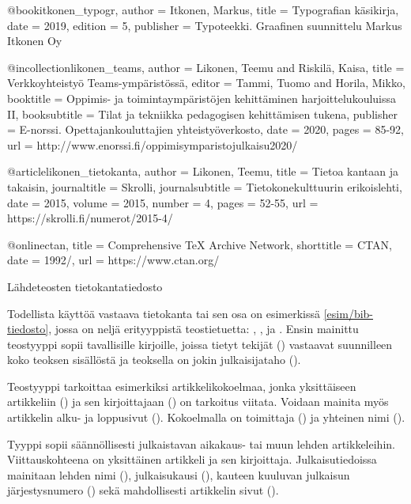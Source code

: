 \begin{esimerkki*}
\begin{koodilohko}
@book{itkonen_typogr,
  author = {Itkonen, Markus},
  title = {Typografian käsikirja},
  date = {2019},
  edition = {5},
  publisher = {Typoteekki. Graafinen suunnittelu Markus Itkonen Oy}
}

@incollection{likonen_teams,
  author = {Likonen, Teemu and Riskilä, Kaisa},
  title = {Verkkoyhteistyö Teams-ympäristössä},
  editor = {Tammi, Tuomo and Horila, Mikko},
  booktitle = {Oppimis- ja toimintaympäristöjen kehittäminen
    harjoittelukouluissa II},
  booksubtitle = {Tilat ja tekniikka pedagogisen kehittämisen tukena},
  publisher = {E-norssi. Opettajankouluttajien yhteistyöverkosto},
  date = {2020},
  pages = {85-92},
  url = {http://www.enorssi.fi/oppimisymparistojulkaisu2020/}
}

@article{likonen_tietokanta,
  author = {Likonen, Teemu},
  title = {Tietoa kantaan ja takaisin},
  journaltitle = {Skrolli},
  journalsubtitle = {Tietokonekulttuurin erikoislehti},
  date = {2015},
  volume = {2015},
  number = {4},
  pages = {52-55},
  url = {https://skrolli.fi/numerot/2015-4/}
}

@online{ctan,
  title = {Comprehensive TeX Archive Network},
  shorttitle = {CTAN},
  date = {1992/},
  url = {https://www.ctan.org/}
}
\end{koodilohko}
  \caption{Lähdeteosten tietokantatiedosto}
  \label{esim/bib-tiedosto}
\end{esimerkki*}

Todellista käyttöä vastaava tietokanta tai sen osa on esimerkissä
\ref{esim/bib-tiedosto}, jossa on neljä erityyppistä teostietuetta:
, ,  ja .
Ensin mainittu teostyyppi  sopii tavallisille kirjoille,
joissa tietyt tekijät () vastaavat suunnilleen koko
teoksen sisällöstä ja teoksella on jokin julkaisijataho
().

Teostyyppi  tarkoittaa esimerkiksi
artikkelikokoelmaa, jonka yksittäiseen artikkeliin () ja
sen kirjoittajaan () on tarkoitus viitata. Voidaan mainita
myös artikkelin alku- ja loppusivut (). Kokoelmalla on
toimittaja () ja yhteinen nimi ().

Tyyppi  sopii säännöllisesti julkaistavan aikakaus- tai
muun lehden artikkeleihin. Viittauskohteena on yksittäinen artikkeli ja
sen kirjoittaja. Julkaisutiedoissa mainitaan lehden nimi
(), julkaisukausi (), kauteen
kuuluvan julkaisun järjestysnumero () sekä mahdollisesti
artikkelin sivut ().


